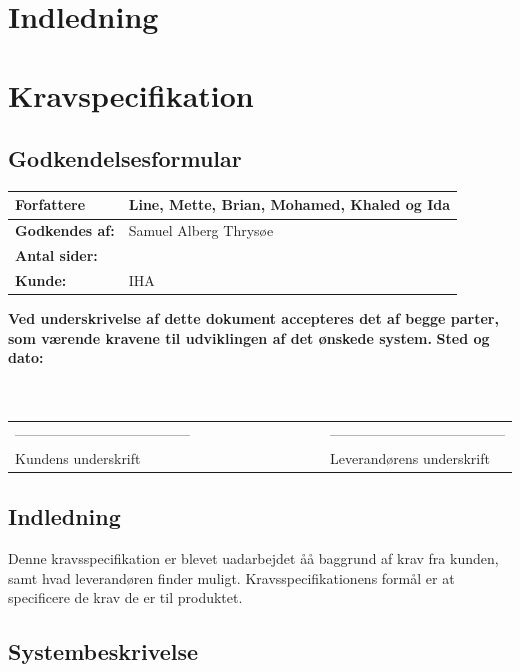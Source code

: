\chapter{Indledning}
\chapter{Kravspecifikation}
\section{Godkendelsesformular}
\begin{table}[h!]
\label{tab:tabel2}
\begin{tabular}{| l | >{\raggedright\arraybackslash}p{12cm} |}
   \hline
   \textbf{Forfattere} & Line, Mette, Brian, Mohamed, Khaled og Ida\\ \hline
   \textbf{Godkendes af:} & Samuel Alberg Thrysøe\\ \hline
   \textbf{Antal sider:} & \\ \hline
   \textbf{Kunde:} & IHA\\ \hline
\end{tabular}
\end{table}
\textbf{Ved underskrivelse af dette dokument accepteres det af begge parter, som værende kravene til udviklingen af det ønskede system.}
\newline
\textbf{Sted og dato:}\\
\\
\\
\begin{table}
[h!]
\begin{tabular}{ l lllllllll l}
--------------------------------------&&&&&&&&&&--------------------------------------\\ 
Kundens underskrift &&&&&&&&&&Leverandørens underskrift\\
\end{tabular}
\end{table}
\section{Indledning}
Denne kravsspecifikation er blevet uadarbejdet åå baggrund af krav fra kunden, samt hvad leverandøren finder muligt. Kravsspecifikationens formål er at specificere de krav de er til produktet.
\newpage

\section{Systembeskrivelse}

